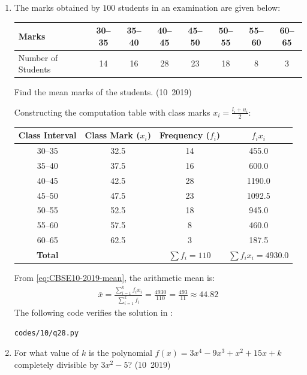 \begin{enumerate}[label=\thesubsection.\arabic*, ref=\thesubsection.\theenumi]
	\item The marks obtained by $100$ students in an examination are given below:
	\begin{center}
		\begin{tabular}{|l|c|c|c|c|c|c|c|}
			\hline
			Marks & 30--35 & 35--40 & 40--45 & 45--50 & 50--55 & 55--60 & 60--65\\
			\hline
			Number of Students & 14 & 16 & 28 & 23 & 18 & 8 & 3\\
			\hline
		\end{tabular}
	\end{center}
	Find the mean marks of the students.
	\hfill (10~2019)
	
	\solution
	Constructing the computation table with class marks $x_i = \frac{l_i + u_i}{2}$:
	\begin{center}
		\begin{tabular}{|c|c|c|c|}
			\hline
			Class Interval & Class Mark ($x_i$) & Frequency ($f_i$) & $f_i x_i$ \\
			\hline
			30--35 & 32.5 & 14 & 455.0 \\
			35--40 & 37.5 & 16 & 600.0 \\
			40--45 & 42.5 & 28 & 1190.0 \\
			45--50 & 47.5 & 23 & 1092.5 \\
			50--55 & 52.5 & 18 & 945.0 \\
			55--60 & 57.5 & 8  & 460.0 \\
			60--65 & 62.5 & 3  & 187.5 \\
			\hline
			\textbf{Total} & & $\sum f_i = 110$ & $\sum f_i x_i = 4930.0$ \\
			\hline
		\end{tabular}
	\end{center}
	From \eqref{eq:CBSE10-2019-mean}, the arithmetic mean is:
	\begin{align}
		\bar{x} = \frac{\sum_{i=1}^k f_i x_i}{\sum_{i=1}^k f_i} = \frac{4930}{110} = \frac{493}{11} \approx 44.82
	\end{align}
	The following code verifies the solution in :
	\begin{lstlisting}[frame=single, basicstyle=\ttfamily\small]
		codes/10/q28.py
	\end{lstlisting}

	
	\item For what value of $k$ is the polynomial $f(x)=3x^4-9x^3+x^2+15x+k$ completely divisible by $3x^2-5$?
	\hfill (10~2019)
	

\end{enumerate}

